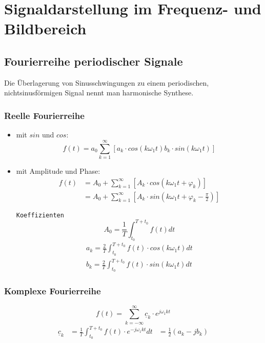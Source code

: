 \section{Signaldarstellung im Frequenz- und Bildbereich}
\subsection{Fourierreihe periodischer Signale}
Die Überlagerung von Sinusschwingungen zu einem periodischen,
nichtsinusförmigen Signal nennt man harmonische Synthese.
\subsubsection{Reelle Fourierreihe}
\begin{mdframed}[style=exercise]
    \begin{itemize}
        \item mit $sin$ und $cos$:
            \[
                f(t) = a_0 \sum_{k=1}^\infty [a_k\cdot cos(k\omega_1 t) b_k\cdot sin(k\omega_1 t)]
            \]
        \item mit Amplitude und Phase:
            \begin{align*}
                f(t) &= A_0+\sum_{k=1}^\infty [A_k\cdot cos(k\omega_1 t + \varphi_k)]\\
                    &= A_0+\sum_{k=1}^\infty [A_k\cdot sin(k\omega_1 t + \varphi_k-\frac{\pi}{2})]
            \end{align*}

            \texttt{\footnotesize Koeffizienten }
            \[
                A_0 = \frac{1}{T}\int_{t_0}^{T+t_0} f(t)dt
            \]
            \begin{align*}
                a_k = \frac{2}{T}\int_{t_0}^{T+t_0} f(t)\cdot cos(k\omega_1 t) dt\\
                b_k = \frac{2}{T}\int_{t_0}^{T+t_0} f(t)\cdot sin(k\omega_1 t) dt
            \end{align*}
    \end{itemize}
\end{mdframed}

\subsubsection{Komplexe Fourierreihe}
\begin{mdframed}[style=exercise]
    \[
        f(t)=\sum_{k=-\infty}^{\infty} \underline{c}_k\cdot e^{j\omega_1 k t}
    \]
    \begin{align*}
        \underline{c}_k &= \frac{1}{T}\int_{t_0}^{T+t_0} f(t)\cdot e^{-j\omega_1 k t}dt
                        &= \frac{1}{2}\left( a_k-jb_k \right)
    \end{align*}
\end{mdframed}

